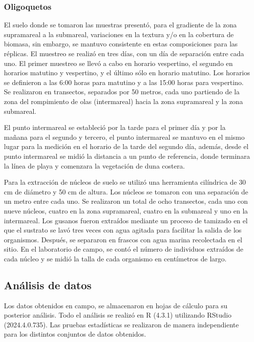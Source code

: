 \documentclass[
  authoryear,
  preprint,
  3p,
  twocolumn]{elsarticle}
\begin{document}
\subsubsection{Oligoquetos}\label{oligoquetos}

El suelo donde se tomaron las muestras presentó, para el gradiente de la
zona supramareal a la submareal, variaciones en la textura y/o en la
cobertura de biomasa, sin embargo, se mantuvo consistente en estas
composiciones para las réplicas. El muestreo se realizó en tres días,
con un día de separación entre cada uno. El primer muestreo se llevó a
cabo en horario vespertino, el segundo en horarios matutino y
vespertino, y el último sólo en horario matutino. Los horarios se
definieron a las 6:00 horas para matutino y a las 15:00 horas para
vespertino. Se realizaron en transectos, separados por 50 metros, cada
uno partiendo de la zona del rompimiento de olas (intermareal) hacia la
zona supramareal y la zona submareal.

El punto intermareal se estableció por la tarde para el primer día y por
la mañana para el segundo y tercero, el punto intermareal se mantuvo en
el mismo lugar para la medición en el horario de la tarde del segundo
día, además, desde el punto intermareal se midió la distancia a un punto
de referencia, donde terminara la línea de playa y comenzara la
vegetación de duna costera.

Para la extracción de núcleos de suelo se utilizó una herramienta
cilíndrica de 30 cm de diámetro y 50 cm de altura. Los núcleos se
tomaron con una separación de un metro entre cada uno. Se realizaron un
total de ocho transectos, cada uno con nueve núcleos, cuatro en la zona
supramareal, cuatro en la submareal y uno en la intermareal. Los gusanos
fueron extraídos mediante un proceso de tamizado en el que el sustrato
se lavó tres veces con agua agitada para facilitar la salida de los
organismos. Después, se separaron en frascos con agua marina recolectada
en el sitio. En el laboratorio de campo, se contó el número de
individuos extraídos de cada núcleo y se midió la talla de cada
organismo en centímetros de largo.

\subsection{\texorpdfstring{\textbf{Análisis de
datos}}{Análisis de datos}}\label{anuxe1lisis-de-datos}

Los datos obtenidos en campo, se almacenaron en hojas de cálculo para su
posterior análisis. Todo el análisis se realizó en R (4.3.1) utilizando
RStudio (2024.4.0.735). Las pruebas estadísticas se realizaron de manera
independiente para los distintos conjuntos de datos obtenidos.
\end{document}
